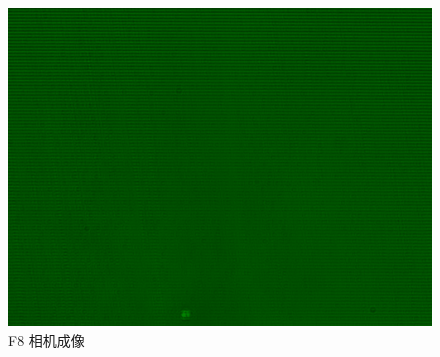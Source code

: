 \documentclass{ctexart}
\begin{document}
\begin{figure}[H]
\begin{minipage}[b]{0.3\textwidth}
    \includegraphics[width=\textwidth]{pictures/F8-mask-Ex20.png}
    \caption{F8 相机成像}
  \end{minipage}
\end{figure}
\end{document}
